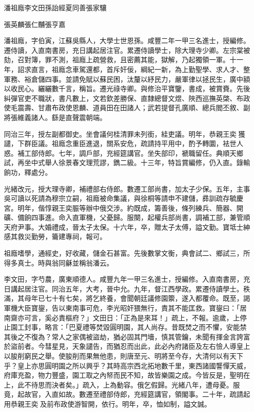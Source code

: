 
\begin{pinyinscope}
潘祖廕李文田孫詒經夏同善張家驤

張英麟張仁黼張亨嘉

潘祖廕，字伯寅，江蘇吳縣人，大學士世恩孫。咸豐二年一甲三名進士，授編修。遷侍讀，入直南書房，充日講起居注官。累遷侍讀學士，除大理寺少卿。左宗棠被劾，召對簿，罪不測，祖廕上疏營救，且密薦其能，獄解，乃起獨領一軍。十一年，詔求直言，祖廕念車駕還都，首斥奸佞，綱紀一新，為上勤聖學、求人才、整軍務、裕倉儲四事。並請免賦以蘇民困，汰釐以紓民力，嚴軍律以拯民生，廣中額以收民心。纚纚數千言，稱旨。遷光祿寺卿。與修治平寶鑒，書成，被賞賚。先後糾彈官吏不職狀，書凡數上，文若欽差勝保、直隸總督文煜、陜西巡撫英棨、布政使毛震壽、甘肅布政使恩麟、道員田在田諸人；武若提督孔廣順、總兵閻丕敘、副將張維義諸人。繇是直聲震朝端。

同治三年，授左副都御史。坐會議何桂清罪未列銜，絓吏議。明年，恭親王奕獲譴，下群臣議。祖廕念重臣進退，關系安危，疏請持平用中，酌予轉圜，袪世人惑。補工部侍郎。七年，調戶部，充經筵講官。坐失部印，褫職留任。典順天鄉試，再坐中式舉人徐景春文理荒謬，鐫二級。十三年，特旨賞編修，仍入直。錄輸餉功，釋處分。

光緒改元，授大理寺卿，補禮部右侍郎。數遷工部尚書，加太子少保。五年，主事吳可讀以死請為穆宗立嗣，祖廕被命集議，與徐桐等請申不建儲，彞訓疏存毓慶宮。明年，偕惇親王奕脤等辦中俄交涉。約既成，籌善後，條列練兵、簡器、開礦、備餉四事進。命入直軍機，父憂歸。服闋，起權兵部尚書，調補工部，兼管順天府尹事。大婚禮成，晉太子太保。十六年，卒，贈太子太傅，謚文勤。寶坻士紳感其救災勤勞，籥建專祠，報可。

祖廕嗜學，通經史，好收藏，儲金石甚富。先後數掌文衡，典會試二、鄉試三，所得多真士。時與翁同龢並稱翁潘云。

李文田，字芍農，廣東順德人。咸豐九年一甲三名進士，授編修。入直南書房，充日講起居注官。同治五年，大考，晉中允。九年，督江西學政。累遷侍讀學士。秩滿，其母年已七十有七矣，將乞終養，會聞朝廷議修園籞，遂入都覆命。既至，謁軍機大臣寶鋆，告以東南事可危，李光昭奸猥無行，責其不能匡救。寶鋆曰：「居南齋亦可言，奚必責樞府？」文田日：「正為是來耳！」疏上，不報。逾歲，上停止園工封事，略言：「巴夏禮等焚毀圓明園，其人尚存。昔既焚之而不懼，安能禁其後之不復為？常人之家偶被盜劫，猶必固其門墻，慎其管鑰，未聞有揮金言誇富於盜前者。今彗星見，天象譴告，而猶忍而出此，此必內府諸臣及左右憸人導皇上以朘削窮民之舉。使朘削而果無他患，則唐至元、明將至今存，大清何以有天下乎？皇上亦思圓明園之所以興乎？其時高宗西北拓地數千里，東西諸國讋憚天威，府庫充盈，物力豐盛，園工取之內帑而民不知，故皆樂園之成。今皆反是，聖明在上，此不待思而決者矣。」疏入，上為動容。俄乞假歸。光緒八年，遭母憂。服竟，起故官，入直如故。數遷至禮部侍郎，充經筵講官，領閣事。二十年，疏請起用恭親王奕及前布政使游智開，依行。明年，卒，恤如制，謚文誠。


\end{pinyinscope}
